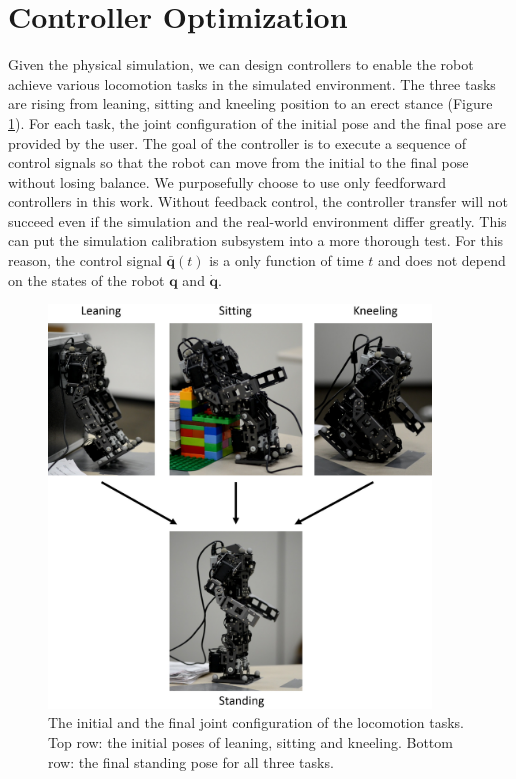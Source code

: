 \section{Controller Optimization}

Given the physical simulation, we can design controllers to enable the robot achieve various locomotion tasks in the simulated environment. The three tasks are rising from leaning, sitting and kneeling position to an erect stance (Figure \ref{fig:task}). For each task, the joint configuration of the initial pose and the final pose are provided by the user. The goal of the controller is to execute a sequence of control signals so that the robot can move from the initial to the final pose without losing balance. We purposefully choose to use only feedforward controllers in this work. Without feedback control, the controller transfer will not succeed even if the simulation and the real-world environment differ greatly. This can put the simulation calibration subsystem into a more thorough test. For this reason, the control signal $\bar{\mathbf{q}}(t)$ is a only function of time $t$ and does not depend on the states of the robot $\mathbf{q}$ and $\dot{\mathbf{q}}$.

\begin{figure}[!t]
  \centering
  \includegraphics[width=4in]{figures/initialFinal}
  \caption{The initial and the final joint configuration of the locomotion tasks. Top row: the initial poses of leaning, sitting and kneeling. Bottom row: the final standing pose for all three tasks.}
  \label{fig:task}
\end{figure}


